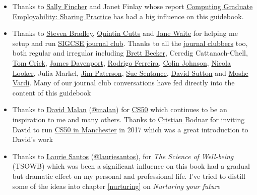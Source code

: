 \documentclass[
]{book}
\providecommand{\tightlist}{%
  \setlength{\itemsep}{0pt}\setlength{\parskip}{0pt}}
\begin{document}
\begin{itemize}
\tightlist
\item
  Thanks to \href{https://en.wikipedia.org/wiki/Sally_Fincher}{Sally Fincher} and Janet Finlay whose report \href{https://kar.kent.ac.uk/53848}{Computing Graduate Employability: Sharing Practice} \citep{fincherreview} has had a big influence on this guidebook.
\item
  Thanks to \href{https://www.dur.ac.uk/research/directory/staff/?mode=staff\&id=106}{Steven Bradley}, \href{https://www.gla.ac.uk/schools/computing/staff/quintincutts/}{Quintin Cutts} and \href{http://eecs.qmul.ac.uk/profiles/waitejanelisa.html}{Jane Waite} for helping me setup and run \href{https://sigcse.cs.manchester.ac.uk/}{SIGCSE journal club}. Thanks to all the \href{https://sigcse.cs.manchester.ac.uk/who/}{journal clubbers} too, both regular and irregular including \href{https://www.brettbecker.com/}{Brett Becker}, Ceredig Cattanach-Chell, \href{https://proftomcrick.com/}{Tom Crick}, \href{https://en.wikipedia.org/wiki/James_H._Davenport}{James Davenport}, \href{https://riceacademy.rice.edu/junior-fellows/dr-rodrigo-ferreira}{Rodrigo Ferreira}, \href{https://www.nottingham.ac.uk/computerscience/people/colin.johnson}{Colin Johnson}, \href{https://www.gla.ac.uk/pgrs/nicolalooker/}{Nicola Looker}, Julia Markel, \href{https://www.gcu.ac.uk/cebe/staff/jim\%20paterson/}{Jim Paterson}, \href{https://en.wikipedia.org/wiki/Sue_Sentance}{Sue Sentance}, \href{https://www.brookes.ac.uk/templates/pages/staff.aspx?uid=p0073862}{David Sutton} and \href{https://en.wikipedia.org/wiki/Moshe_Vardi}{Moshe Vardi}. Many of our journal club conversations have fed directly into the content of this guidebook
\item
  Thanks to \href{https://en.wikipedia.org/wiki/David_J._Malan}{David Malan} (\href{https://cs.harvard.edu/malan/}{@malan}) for \href{https://en.wikipedia.org/wiki/CS50}{CS50} which continues to be an inspiration to me and many others. \citep{cs50, cs50zoom, CS502021} Thanks to \href{https://crisbodnar.github.io/}{Cristian Bodnar} for inviting David to run \href{http://cs50.hacksoc.com}{CS50 in Manchester} in 2017 which was a great introduction to David's work \citep{cs50mcr}
\item
  Thanks to \href{https://en.wikipedia.org/wiki/Laurie_R._Santos}{Laurie Santos} (\href{https://twitter.com/lauriesantos}{@lauriesantos}), for \emph{The Science of Well-being} (TSOWB) \citep{lauriesantos} which was been a significant influence on this book had a gradual but dramatic effect on my personal and professional life. I've tried to distill some of the ideas into chapter \ref{nurturing} on \emph{Nurturing your future}

\end{itemize}
\end{document}
